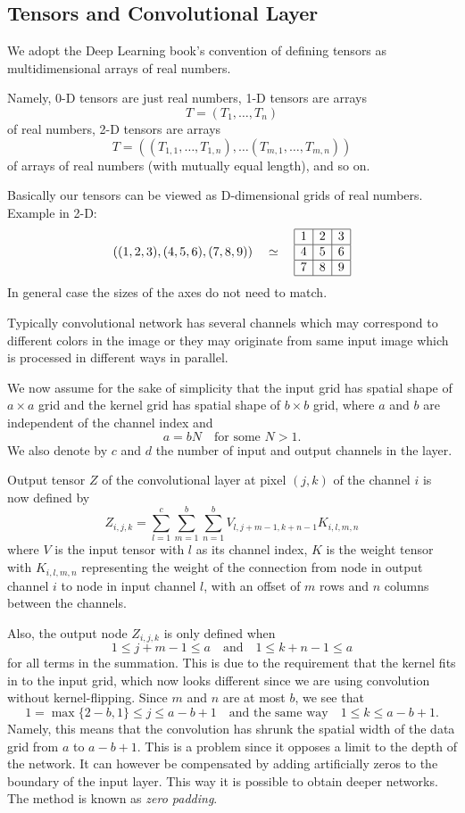 \documentclass[]{article}
\begin{document}
\subsection{Tensors and Convolutional Layer}
We adopt the Deep Learning book's convention of defining tensors as
multidimensional arrays of real numbers.

Namely, 0-D tensors are just real numbers, 1-D tensors are arrays
\[
T = (T_1, \ldots, T_n)
\]
of real numbers, 2-D tensors are arrays
\[
T = ((T_{1,1}, \ldots, T_{1,n}), \ldots (T_{m,1}, \ldots, T_{m,n}))
\]
of arrays of real numbers (with mutually equal length), and so on.

Basically our tensors can be viewed as D-dimensional grids of real numbers.
Example in 2-D:
\[
((1, 2, 3), (4, 5, 6), (7, 8, 9)) \quad \simeq \quad
\begin{array}{|c|c|c|}
  \hline
  1 & 2 & 3 \\
  \hline
  4 & 5 & 6 \\
  \hline
  7 & 8 & 9 \\
  \hline
\end{array}
\]
In general case the sizes of the axes do not need to match.

Typically convolutional network has several channels which may correspond to different
colors in the image or they may originate from same input image which is processed
in different ways in parallel.

We now assume for the sake of simplicity that the input grid has spatial shape of
$a \times a$ grid and the kernel grid has spatial shape of $b \times b$ grid, where
$a$ and $b$ are independent of the channel index and
\[
a = b N \quad \text{for some $N > 1$}.
\]
We also denote by $c$ and $d$ the number of input and output channels in the layer.

Output tensor $Z$ of the convolutional layer at pixel $(j, k)$ of the channel $i$
is now defined by
\[
Z_{i, j, k} = \sum_{l=1}^c \sum_{m = 1}^b \sum_{n=1}^b
V_{l, j + m -1, k + n -1} K_{i, l, m, n}
\]
where $V$ is the input tensor with $l$ as its channel index, $K$ is the weight tensor with
$K_{i, l, m, n}$ representing the weight of the connection from node in output
channel $i$ to node in input channel $l$, with an offset of $m$ rows and $n$ columns
between the channels.

Also, the output node $Z_{i, j, k}$ is only defined when
\[
1 \le j + m - 1 \le a \quad \text{and} \quad 1 \le k + n - 1 \le a
\]
for all terms in the summation. This is due to the requirement that the kernel fits
in to the input grid, which now looks different since we are using convolution
without kernel-flipping. Since $m$ and $n$ are at most $b$, we see that
\[
1 = \max\{2 - b, 1\} \le j \le a - b + 1\quad \text{and the same way} \quad 1 \le k \le a - b + 1.
\]
Namely, this means that the convolution has shrunk the spatial width of the data grid
from $a$ to $a - b + 1$. This is a problem since it opposes a limit to the depth of
the network. It can however be compensated by adding artificially zeros to the
boundary of the input layer. This way it is possible to obtain deeper networks. The
method is known as \emph{zero padding}.
\end{document}
